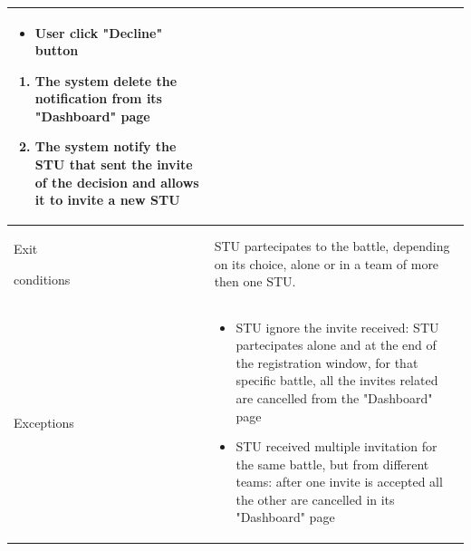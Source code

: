 \begin{center}
\begin{tabular}{| m{2cm} | m{10cm}|}
\begin{enumerate}
                                        \begin{itemize}
                                            \item User click "Decline" button
                                        \end{itemize} 
                                            \begin{enumerate}
                                                \item The system delete the notification from its "Dashboard" page
                                                \item The system notify the STU that sent the invite of the decision and allows it to invite a new STU
                                            \end{enumerate}
                                \end{enumerate}                      \\ \hline
        Exit \par conditions  & STU partecipates to the battle, depending on its choice, alone or in a team of more then one STU.                                  \\ \hline
        Exceptions            & \begin{itemize}
                                    \item STU ignore the invite received: STU partecipates alone and at the end of the registration window, for that specific battle, all the invites related are cancelled from the "Dashboard" page
                                    \item STU received multiple invitation for the same battle, but from different teams: after one invite is accepted all the other are cancelled in its "Dashboard" page
                                \end{itemize}                        \\ \hline
    \end{tabular}
\end{center}

